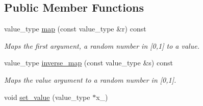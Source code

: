 \subsection*{Public Member Functions}
\begin{DoxyCompactItemize}
\item 
\hypertarget{a00001_adac0f8fb0239c625b6c1ab36d44eaaea}{}value\+\_\+type \hyperlink{a00001_adac0f8fb0239c625b6c1ab36d44eaaea}{map} (const value\+\_\+type \&r) const \label{a00001_adac0f8fb0239c625b6c1ab36d44eaaea}

\begin{DoxyCompactList}\small\item\em Maps the first argument, a random number in \mbox{[}0,1\mbox{]} to a value. \end{DoxyCompactList}\item 
\hypertarget{a00001_a6e4d6274ba8d71ac1b2df8b18bd3a3d1}{}value\+\_\+type \hyperlink{a00001_a6e4d6274ba8d71ac1b2df8b18bd3a3d1}{inverse\+\_\+map} (const value\+\_\+type \&s) const \label{a00001_a6e4d6274ba8d71ac1b2df8b18bd3a3d1}

\begin{DoxyCompactList}\small\item\em Maps the value argument to a random number in \mbox{[}0,1\mbox{]}. \end{DoxyCompactList}\item 
\hypertarget{a00001_aea077da74c72d6f2ba36669a95bcc99e}{}void \hyperlink{a00001_aea077da74c72d6f2ba36669a95bcc99e}{set\+\_\+value} (value\+\_\+type $\ast$x\+\_\+)\label{a00001_aea077da74c72d6f2ba36669a95bcc99e}


\end{DoxyCompactItemize}

